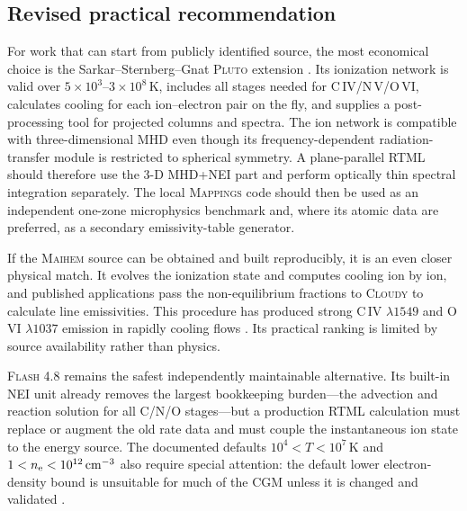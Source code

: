 \documentclass[english,a4paper]{my_memo2}
\newcommand{\nelec}{n_{\rm e}}
\begin{document}
\subsection{Revised practical recommendation}

For work that can start from publicly identified source, the most economical
choice is the Sarkar--Sternberg--Gnat \textsc{Pluto} extension
\cite{Sarkar2021}.  Its ionization network is valid over
$5\times10^3$--$3\times10^8\,\mathrm{K}$, includes all stages needed for
C\,IV/N\,V/O\,VI, calculates cooling for each ion--electron pair on the fly,
and supplies a post-processing tool for projected columns and spectra.  The
ion network is compatible with three-dimensional MHD even though its
frequency-dependent radiation-transfer module is restricted to spherical
symmetry.  A plane-parallel RTML should therefore use the 3-D MHD+NEI part and
perform optically thin spectral integration separately.  The local
\textsc{Mappings} code should then be used as an independent one-zone
microphysics benchmark and, where its atomic data are preferred, as a
secondary emissivity-table generator.

If the \textsc{Maihem} source can be obtained and built reproducibly, it is an
even closer physical match.  It evolves the ionization state and computes
cooling ion by ion, and published applications pass the non-equilibrium
fractions to \textsc{Cloudy} to calculate line emissivities.  This procedure
has produced strong C\,IV $\lambda1549$ and O\,VI $\lambda1037$ emission in
rapidly cooling flows \cite{Gray2019}.  Its practical ranking is limited by
source availability rather than physics.

\textsc{Flash} 4.8 remains the safest independently maintainable alternative.
Its built-in NEI unit already removes the largest bookkeeping burden---the
advection and reaction solution for all C/N/O stages---but a production RTML
calculation must replace or augment the old rate data and must couple the
instantaneous ion state to the energy source.  The documented defaults
$10^4<T<10^7\,\mathrm{K}$ and
$1<\nelec<10^{12}\,\mathrm{cm}^{-3}$ also require special attention:
the default lower electron-density bound is unsuitable for much of the CGM
unless it is changed and validated \cite{FLASHGuide}.
\end{document}
